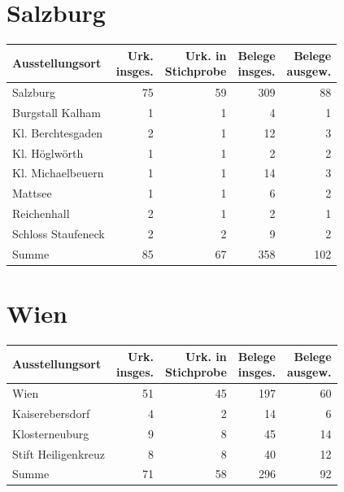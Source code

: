 \section{Salzburg}

\begin{tabularx}{\linewidth}{X r r r r}
\toprule
Ausstellungsort
	& \makecell{Urk.\\ insges.}
	& \makecell{Urk. in\\ Stichprobe}
	& \makecell{Belege\\ insges.}
	& \makecell{Belege\\ ausgew.}
	\\
\midrule

Salzburg
	& 75
	& 59
	& 309
	& 88
	\\

Burgstall Kalham
	& 1
	& 1
	& 4
	& 1
	\\

Kl. Berchtesgaden
	& 2
	& 1
	& 12
	& 3
	\\

Kl. Höglwörth
	& 1
	& 1
	& 2
	& 2
	\\

Kl. Michaelbeuern
	& 1
	& 1
	& 14
	& 3
	\\

Mattsee
	& 1
	& 1
	& 6
	& 2
	\\

Reichenhall
	& 2
	& 1
	& 2
	& 1
	\\

Schloss Staufeneck
	& 2
	& 2
	& 9
	& 2
	\\

\midrule

Summe
	& 85
	& 67
	& 358
	& 102
	\\

\bottomrule
\end{tabularx}

\section{Wien}

\begin{tabularx}{\linewidth}{X r r r r}
\toprule
Ausstellungsort
	& \makecell{Urk.\\ insges.}
	& \makecell{Urk. in\\ Stichprobe}
	& \makecell{Belege\\ insges.}
	& \makecell{Belege\\ ausgew.}
	\\
\midrule

Wien
	& 51
	& 45
	& 197
	& 60
	\\

Kaiserebersdorf
	& 4
	& 2
	& 14
	& 6
	\\

Klosterneuburg
	& 9
	& 8
	& 45
	& 14
	\\

Stift Heiligenkreuz
	& 8
	& 8
	& 40
	& 12
	\\

\midrule

Summe
	& 71
	& 58
	& 296
	& 92
	\\

\bottomrule
\end{tabularx}
